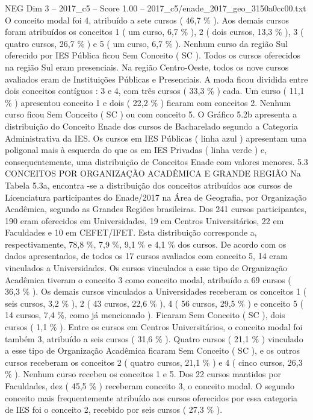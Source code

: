 \begin{textsample}{NEG Dim 3 – 2017\_c5 – Score 1.00 – 2017\_c5/enade\_2017\_geo\_3150a0cc00.txt}
O conceito modal foi 4, atribuído a sete cursos ( 46,7 \% ).
Aos demais cursos foram atribuídos os conceitos 1 ( um curso, 6,7 \% ), 2 ( dois cursos, 13,3 \% ), 3 ( quatro cursos, 26,7 \% ) e 5 ( um curso, 6,7 \% ).
Nenhum curso da região Sul oferecido por IES Pública ficou Sem Conceito ( SC ).
Todos os cursos oferecidos na região Sul eram presenciais.
Na região Centro-Oeste, todos os nove cursos avaliados eram de Instituições Públicas e Presenciais.
A moda ficou dividida entre dois conceitos contíguos : 3 e 4, com três cursos ( 33,3 \% ) cada.
Um curso ( 11,1 \% ) apresentou conceito 1 e dois ( 22,2 \% ) ficaram com conceitos 2.
Nenhum curso ficou Sem Conceito ( SC ) ou com conceito 5.
O Gráfico 5.2b apresenta a distribuição do Conceito Enade dos cursos de Bacharelado segundo a Categoria Administrativa da IES.
Os cursos em IES Públicas ( linha azul ) apresentam uma poligonal mais à esquerda do que os em IES Privadas ( linha verde ) e, consequentemente, uma distribuição de Conceitos Enade com valores menores. 5.3 CONCEITOS POR ORGANIZAÇÃO ACADÊMICA E GRANDE REGIÃO Na Tabela 5.3a, encontra -se a distribuição dos conceitos atribuídos aos cursos de Licenciatura participantes do Enade/2017 na Área de Geografia, por Organização Acadêmica, segundo as Grandes Regiões brasileiras.
Dos 241 cursos participantes, 190 eram oferecidos em Universidades, 19 em Centros Universitários, 22 em Faculdades e 10 em CEFET/IFET.
Esta distribuição corresponde a, respectivamente, 78,8 \%, 7,9 \%, 9,1 \% e 4,1 \% dos cursos.
De acordo com os dados apresentados, de todos os 17 cursos avaliados com conceito 5, 14 eram vinculados a Universidades.
Os cursos vinculados a esse tipo de Organização Acadêmica tiveram o conceito 3 como conceito modal, atribuído a 69 cursos ( 36,3 \% ).
Os demais cursos vinculados a Universidades receberam os conceitos 1 ( seis cursos, 3,2 \% ), 2 ( 43 cursos, 22,6 \% ), 4 ( 56 cursos, 29,5 \% ) e conceito 5 ( 14 cursos, 7,4 \%, como já mencionado ).
Ficaram Sem Conceito ( SC ), dois cursos ( 1,1 \% ).
Entre os cursos em Centros Universitários, o conceito modal foi também 3, atribuído a seis cursos ( 31,6 \% ).
Quatro cursos ( 21,1 \% ) vinculado a esse tipo de Organização Acadêmica ficaram Sem Conceito ( SC ), e os outros cursos receberam os conceitos 2 ( quatro cursos, 21,1 \% ) e 4 ( cinco cursos, 26,3 \% ).
Nenhum curso recebeu os conceitos 1 e 5.
Dos 22 cursos mantidos por Faculdades, dez ( 45,5 \% ) receberam conceito 3, o conceito modal.
O segundo conceito mais frequentemente atribuído aos cursos oferecidos por essa categoria de IES foi o conceito 2, recebido por seis cursos ( 27,3 \% ).

\end{textsample}
